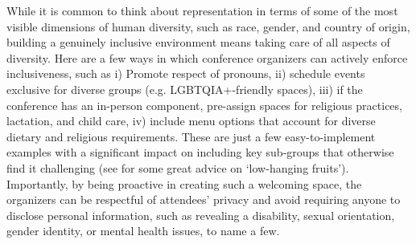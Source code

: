 \documentclass[10pt,letterpaper]{article}
\begin{document}
While it is common to think about representation in terms of some of the most visible dimensions of human diversity, such as race, gender, and country of origin, building a genuinely inclusive environment means taking care of all aspects of diversity. %
Here are a few ways in which conference organizers can actively enforce inclusiveness, such as i) Promote respect of pronouns, ii) schedule events exclusive for diverse groups (e.g. LGBTQIA+-friendly spaces), iii) if the conference has an in-person component, pre-assign spaces for religious practices, lactation, and child care, iv) include menu options that account for diverse dietary and religious requirements. These are just a few easy-to-implement examples with a significant impact on including key sub-groups that otherwise find it challenging (see \cite{noauthor_discover2021} for some great advice on `low-hanging fruits').
Importantly, by being proactive in creating such a welcoming space, the organizers can be respectful of attendees' privacy and avoid requiring anyone to disclose personal information, such as revealing a disability, sexual orientation, gender identity, or mental health issues, to name a few.
\end{document}
